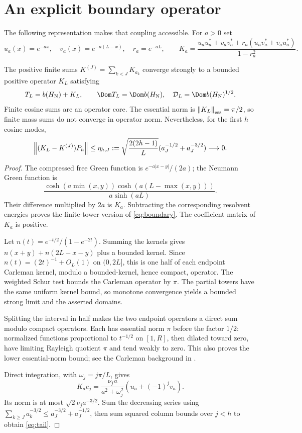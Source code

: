 \section{An explicit boundary operator}
The following representation makes that coupling accessible. For $a>0$ set
\[
u_a(x)=e^{-ax},\quad v_a(x)=e^{-a(L-x)},\quad r_a=e^{-aL},\qquad
K_a=\frac{u_au_a^*+v_av_a^*+r_a(u_av_a^*+v_au_a^*)}{1-r_a^2}.
\]
\begin{theorem}\label{thm:boundary}
The positive finite sums $K^{(J)}=\sum_{k<J}K_{a_k}$ converge strongly to
a bounded positive operator $K_L$ satisfying
\begin{equation}\label{eq:boundary}
T_L=b(H_{\rm N})+K_L,\qquad
\Dom T_L=\Dom b(H_{\rm N}),\quad
\mathcal D_L=\Dom b(H_{\rm N})^{1/2}.
\end{equation}
Finite cosine sums are an operator core. The essential norm is
$\left\lVert K_L\right\rVert_{\rm ess}=\pi/2$, so finite mass sums do not converge in
operator norm. Nevertheless, for the first $h$ cosine modes,
\begin{equation}\label{eq:tail}
\left\lVert(K_L-K^{(J)})P_h\right\rVert\le
\eta_{h,J}:=\sqrt{\frac{2(2h-1)}L}
 (a_J^{-1/2}+a_J^{-3/2})\longrightarrow0.
\end{equation}
\end{theorem}
\begin{proof}
The compressed free Green function is $e^{-a|x-y|}/(2a)$; the Neumann
Green function is
\[
\frac{\cosh(a\min(x,y))\cosh(a(L-\max(x,y)))}{a\sinh(aL)}.
\]
Their difference multiplied by $2a$ is $K_a$. Subtracting the corresponding
resolvent energies proves the finite-tower version of \eqref{eq:boundary}.
The coefficient matrix of $K_a$ is positive.

Let $n(t)=e^{-t/2}/(1-e^{-2t})$. Summing the kernels gives
$n(x+y)+n(2L-x-y)$ plus a bounded kernel. Since
$n(t)=(2t)^{-1}+O_L(1)$ on $(0,2L]$, this is one half of each endpoint
Carleman kernel, modulo a bounded-kernel, hence compact, operator. The
weighted Schur test bounds the Carleman operator by $\pi$. The partial
towers have the same uniform kernel bound, so monotone convergence yields
a bounded strong limit and the asserted domains.

Splitting the interval in half makes the two endpoint operators a direct
sum modulo compact operators. Each has essential norm $\pi$ before the
factor $1/2$: normalized functions proportional to $t^{-1/2}$ on $[1,R]$,
then dilated toward zero, have limiting Rayleigh quotient $\pi$ and tend
weakly to zero. This also proves the lower essential-norm bound; see the
Carleman background in \cite{Yafaev}.

Direct integration, with $\omega_j=j\pi/L$, gives
\begin{equation}\label{eq:column}
K_ae_j=\frac{\nu_j a}{a^2+\omega_j^2}(u_a+(-1)^jv_a).
\end{equation}
Its norm is at most $\sqrt2\nu_j a^{-3/2}$. Sum the decreasing series
using $\sum_{k\ge J}a_k^{-3/2}\le a_J^{-3/2}+a_J^{-1/2}$, then sum squared
column bounds over $j<h$ to obtain \eqref{eq:tail}.
\end{proof}

